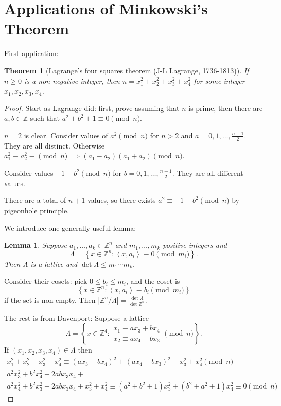 \documentclass{report}
\newcommand{\Z}{\mathbb{Z}}
\newcommand{\inner}[2]{\left\langle #1, #2\right\rangle}
\newcommand{\set}[1]{\left\{ #1 \right\}}
\newtheorem{theorem}{Theorem}[section]
\newtheorem{lemma}{Lemma}[section]
\theoremstyle{definition}
\theoremstyle{remark}
\numberwithin{equation}{section}
\begin{document}
\section{Applications of Minkowski's Theorem}
First application:
\begin{theorem}[Lagrange's four squares theorem (J-L Lagrange, 1736-1813)]
    If $n \geq 0$ is a non-negative integer, then $n = x_1^2 + x_2^2 + x_3^2 + x_4^2$ for some integer $x_1, x_2, x_3, x_4$.
\end{theorem}
\begin{proof}
    Start as Lagrange did: first, prove assuming that $n$ is prime, then there are $a, b \in \Z$ such that $a^2 + b^2 + 1 \equiv 0 \pmod{n}$.

    $n = 2$ is clear. Consider values of $a^2 \pmod{n}$ for $n > 2$ and $a = 0, 1, \ldots, \frac{n-1}{2}$. They are all distinct. Otherwise $a_1^2 \equiv a_2^2 \equiv \pmod{n} \implies (a_1 - a_2)(a_1 + a_2) \pmod{n}$.

    Consider values $-1-b^2 \pmod{n}$ for $b = 0, 1, \ldots, \frac{n-1}{2}$. They are all different values.

    There are a total of $n+1$ values, so there exists $a^2 \equiv -1 - b^2 \pmod{n}$ by pigeonhole principle.

    We introduce one generally useful lemma:
    \begin{lemma}
        Suppose $a_1, \ldots, a_k \in \Z^n$ and $m_1, \ldots, m_k$ positive integers and
        \[\Lambda = \set{x \in \Z^n: \inner{x}{a_i} \equiv 0 \pmod{m_i}}.\]
        Then $\Lambda$ is a lattice and $\det \Lambda \leq m_1\cdots m_k$.
    \end{lemma}
    Consider their cosets: pick $0 \leq b_i \leq m_i$, and the coset is \[\set{x \in \Z^n: \inner{x}{a_i} \equiv b_i \pmod{m_i}}\] if the set is non-empty. Then $|\Z^n / \Lambda| = \frac{\det\Lambda}{\det \Z^n}$.

    The rest is from Davenport:
    Suppose a lattice \[\Lambda = \set{x \in \Z^4: \begin{array}{c} x_1 \equiv ax_3 + bx_4 \\ x_2 \equiv ax_4 - bx_3\end{array} \pmod{n}}.\]
    If $(x_1, x_2, x_3, x_4) \in \Lambda$ then \begin{align*}
        x_1^2 + x_2^2 + x_3^2 + x_4^2 \equiv (ax_3 + bx_4)^2 + (ax_4 - bx_3)^2 + x_3^2 + x_4^2 \pmod{n} \\
        a^2x_3^2 + b^2x_4^2 + 2abx_3x_4 + \\
        a^2x_4^2 + b^2x_3^2 - 2abx_3x_4 + x_3^2 + x_4^2 \equiv (a^2 + b^2 + 1)x_3^2 + (b^2 + a^2 + 1) x_4^2 \equiv 0 \pmod{n}
    \end{align*}


\end{proof}
\end{document}
